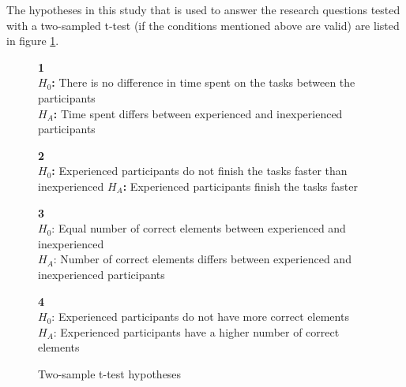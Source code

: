 
The hypotheses in this study that is used to answer the research questions tested with a two-sampled t-test (if the conditions mentioned above are valid) are listed in figure \ref{fig:hypothesis_ttest}. 

\begin{figure}[H]
	\begin{framed}\centering
		\textbf{1}\\
		\textbf{$H_{0}$:} There is no difference in time spent on the tasks between the participants\\
		\textbf{$H_{A}$:} Time spent differs between experienced and inexperienced participants \newline
		
		\textbf{2}\\
		\textbf{$H_{0}$:} Experienced participants do not finish the tasks faster than inexperienced\newline
		\textbf{$H_{A}$:} Experienced participants finish the tasks faster\newline
		
		\textbf{3}\\
		$H_{0}$: Equal number of correct elements between experienced and inexperienced \\
		$H_{A}$: Number of correct elements differs between experienced and inexperienced participants\newline
		
		\textbf{4}\\
		$H_{0}$: Experienced participants do not have more correct elements\\
		$H_{A}$: Experienced participants have a higher number of correct elements\newline
	\end{framed}
	\caption{Two-sample t-test hypotheses}
	\label{fig:hypothesis_ttest}
\end{figure}

